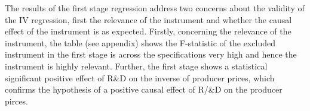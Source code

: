 \par   The results of the first stage regression address two concerns about the validity of the IV regression, first the relevance of the instrument and whether the causal effect of the instrument is as expected.
Firstly, concerning the relevance of the instrument, the table (see appendix) shows the F-statistic of the excluded instrument in the first stage is across the specifications very high and hence the instrument is highly relevant.
Further, the first stage shows a statistical significant positive effect of  R\&D on the inverse of producer prices, which confirms the hypothesis of a positive causal effect of R/&D on the producer pirces.  %
